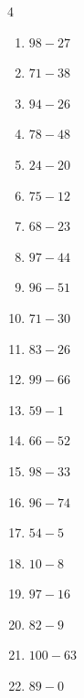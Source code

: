 \begin{multicols}{4}
\begin{enumerate}
  \item $98-27$
        \phantom{$=71$}

  \item $71-38$
        \phantom{$=33$}

  \item $94-26$
        \phantom{$=68$}

  \item $78-48$
        \phantom{$=30$}

  \item $24-20$
        \phantom{$=4$}

  \item $75-12$
        \phantom{$=63$}

  \item $68-23$
        \phantom{$=45$}

  \item $97-44$
        \phantom{$=53$}

  \item $96-51$
        \phantom{$=45$}

  \item $71-30$
        \phantom{$=41$}

  \item $83-26$
        \phantom{$=57$}

  \item $99-66$
        \phantom{$=33$}

  \item $59-1$
        \phantom{$=58$}

  \item $66-52$
        \phantom{$=14$}

  \item $98-33$
        \phantom{$=65$}

  \item $96-74$
        \phantom{$=22$}

  \item $54-5$
        \phantom{$=49$}

  \item $10-8$
        \phantom{$=2$}

  \item $97-16$
        \phantom{$=81$}

  \item $82-9$
        \phantom{$=73$}

  \item $100-63$
        \phantom{$=37$}

  \item $89-0$
        \phantom{$=89$}


\end{enumerate}
\end{multicols}
